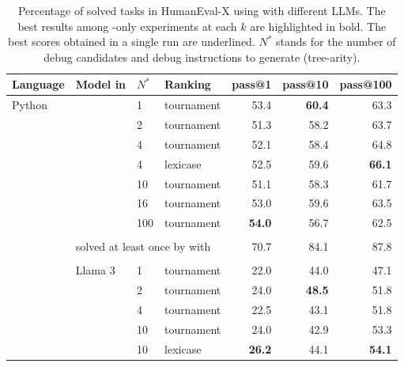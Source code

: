 \begin{table}[t]
    \centering
    \caption{Percentage of solved tasks in HumanEval-X using \method{} with different LLMs. The best results among \method{}-only experiments at each $k$ are highlighted in bold. The best scores obtained in a single run are underlined. $N^*$ stands for the number of debug candidates and debug instructions to generate (tree-arity).}\small
    \label{tab:generalizability-he}
    \vspace{-1.4ex}
\begin{adjustbox}{max width=\textwidth}
\begin{DIFnomarkup} %
\begin{tabular}{llllrrr}
\toprule
Language & Model in \method{} & $N^*$ & Ranking &  pass@1 &  pass@10 &  pass@100 \\
\midrule
Python & \gpt{} & 1   &         tournament &    53.4 &     \textbf{60.4} &      63.3 \\
       &        & 2   &         tournament &    51.3 &     58.2 &      63.7 \\
       &        & 4   &         tournament &    52.1 &     58.4 &      64.8 \\
       &        & 4   &           lexicase &    52.5 &     59.6 &      \textbf{66.1} \\
       &        & 10  &         tournament &    51.1 &     58.3 &      61.7 \\
       &        & 16  &         tournament &    53.0 &     59.6 &      63.5 \\
       &        & 100 &         tournament &    \textbf{54.0} &     56.7 &      62.5 \\[1pt]
\cline{3-7}\\[-8pt]
       & \multicolumn{3}{l}{solved at least once by \method{} with \gpt{}}   & 70.7 &     84.1 &      87.8 \\[1pt]
\cline{2-7}\\[-8pt]
    &   Llama 3 & 1   &         tournament &    22.0 &     44.0 &      47.1 \\
       &        & 2   &         tournament &    24.0 &     \textbf{48.5 }&      51.8 \\
       &        & 4   &         tournament &    22.5 &     43.1 &      51.8 \\
       &        & 10  &         tournament &    24.0 &     42.9 &      53.3 \\
       &        & 10  &           lexicase &    \textbf{26.2} &     44.1 &      \textbf{54.1} \\

\end{tabular}
\end{DIFnomarkup}
\end{adjustbox}
\end{table}
